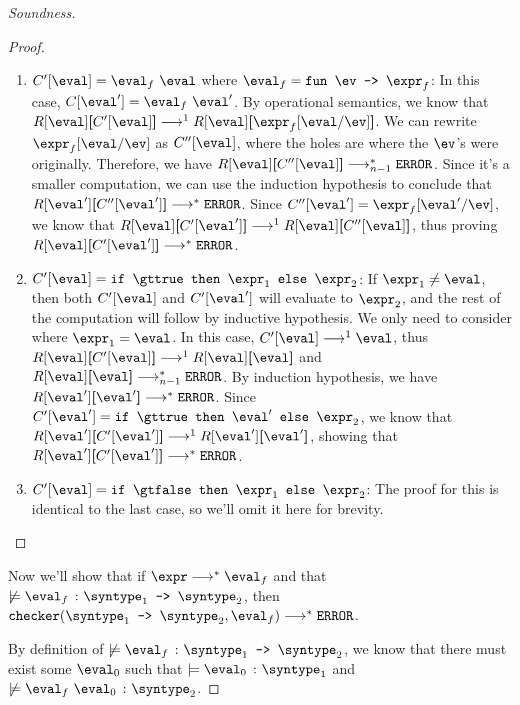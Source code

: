 \begin{proof}[Soundness]
\begin{proof}
\begin{enumerate}
\begin{enumerate}
        \item $C'[\eval] = \eval_f \ \eval$ where $\eval_f = \mkfunv{\ev}{\expr_f}$: In this case, $C[\eval'] = \eval_f \ \eval'$. By operational semantics, we know that $\redcon{\eval}{C'[\eval]} \smallstep[] \redcon{\eval}{\substitute{\expr_f}{\eval}{\ev}}$. We can rewrite $\substitute{\expr_f}{\eval}{\ev}$ as $C''[\eval]$, where the holes are where the $\ev$'s were originally. Therefore, we have $\redcon{\eval}{C''[\eval]} \smallsteps[n-1] \eerror$. Since it's a smaller computation, we can use the  induction hypothesis to conclude that $\redcon{\eval'}{C''[\eval']} \smallsteps[] \eerror$. Since $C''[\eval'] = \substitute{\expr_f}{\eval'}{\ev}$, we know that $\redcon{\eval}{C'[\eval']} \smallstep[] \redcon{\eval}{C''[\eval]}$, thus proving $\redcon{\eval}{C'[\eval']} \smallsteps[] \eerror$.
        
        \item $C'[\eval] = \ife{\gttrue}{\expr_1}{\expr_2}$: If $\expr_1 \neq \eval$, then both $C'[\eval]$ and $C'[\eval']$ will evaluate to $\expr_2$, and the rest of the computation will follow by inductive hypothesis. We only need to consider where $\expr_1 = \eval$. In this case, $C'[\eval] \smallstep[] \eval$, thus $\redcon{\eval}{C'[\eval]} \smallstep[] \redcon{\eval}{\eval}$ and $\redcon{\eval}{\eval} \smallsteps[n-1] \eerror$. By induction hypothesis, we have $\redcon{\eval'}{\eval'} \smallsteps[] \eerror$. Since $C'[\eval'] = \ife{\gttrue}{\eval'}{\expr_2}$, we know that $\redcon{\eval'}{C'[\eval']} \smallstep[] \redcon{\eval'}{\eval'}$, showing that $\redcon{\eval'}{C'[\eval']} \smallsteps[] \eerror$.
        
        \item $C'[\eval] = \ife{\gtfalse}{\expr_1}{\expr_2}$: The proof for this is identical to the last case, so we'll omit it here for brevity.
      \end{enumerate}
    \end{enumerate}

  \end{proof}

  Now we'll show that if $\expr \smallsteps[] \eval_f$ and that $\not \models \hastype{\eval_f}{\mkfun{\syntype_1}{\syntype_2}}$, then $\mkche{\mkfun{\syntype_1}{\syntype_2}}{\eval_f} \smallsteps[] \eerror$. 
    
  By definition of $\not \models \hastype{\eval_f}{\mkfun{\syntype_1}{\syntype_2}}$, we know that there must exist some $\eval_0$ such that $\models \hastype{\eval_0}{\syntype_1}$ and $\not \models \hastype{\eval_f \ \eval_0}{\syntype_2}$.
  

\end{proof}
